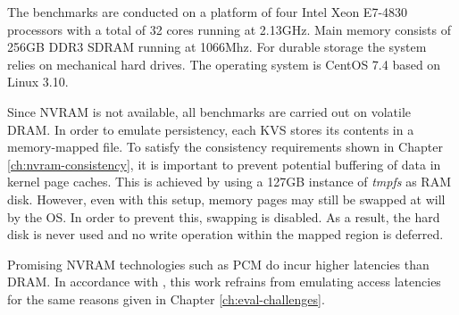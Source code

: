 

The benchmarks are conducted on a platform of four Intel Xeon E7-4830 processors
with a total of 32 cores running at 2.13GHz. Main memory consists of 256GB DDR3
SDRAM running at 1066Mhz. For durable storage the system relies on mechanical
hard drives. The operating system is CentOS 7.4 based on Linux 3.10.

Since NVRAM is not available, all benchmarks are carried out on volatile DRAM.
In order to emulate persistency, each KVS stores its contents in a memory-mapped
file. To satisfy the consistency requirements shown in Chapter
\ref{ch:nvram-consistency}, it is important to prevent potential buffering of
data in kernel page caches. This is achieved by using a 127GB instance of
\emph{tmpfs} as RAM disk. However, even with this setup, memory pages may still
be swapped at will by the OS. In order to prevent this, swapping is disabled. As
a result, the hard disk is never used and no write operation within the mapped
region is deferred.


Promising NVRAM technologies such as PCM do incur higher latencies than DRAM. In
accordance with \cite{bailey2013exploring, zhou2016nvht}, this work refrains
from emulating access latencies for the same reasons given in Chapter
\ref{ch:eval-challenges}.
